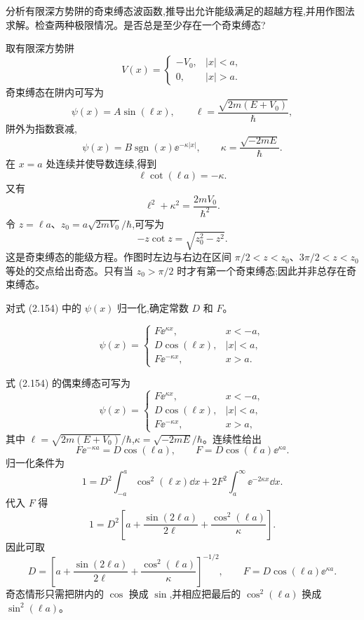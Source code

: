 \begin{question}
分析有限深方势阱的奇束缚态波函数,推导出允许能级满足的超越方程,并用作图法求解。检查两种极限情况。是否总是至少存在一个奇束缚态?
\begin{solution}
取有限深方势阱
\[
V(x)=\begin{cases}-V_0,& |x|<a,\\0,& |x|>a.
\end{cases}
\]
奇束缚态在阱内可写为
\[
\psi(x)=A\sin(\ell x),
\qquad
\ell=\frac{\sqrt{2m(E+V_0)}}{\hbar},
\]
阱外为指数衰减,
\[
\psi(x)=B\operatorname{sgn}(x)\ee^{-\kappa |x|},
\qquad
\kappa=\frac{\sqrt{-2mE}}{\hbar}.
\]
在 $x=a$ 处连续并使导数连续,得到
\[
\ell\cot(\ell a)=-\kappa.
\]
又有
\[
\ell^2+\kappa^2=\frac{2mV_0}{\hbar^2}.
\]
令 $z=\ell a$、$z_0=a\sqrt{2mV_0}/\hbar$,可写为
\[
-z\cot z=\sqrt{z_0^2-z^2}.
\]
这是奇束缚态的能级方程。作图时左边与右边在区间 $\pi/2<z<z_0$、$3\pi/2<z<z_0$ 等处的交点给出奇态。只有当 $z_0>\pi/2$ 时才有第一个奇束缚态;因此并非总存在奇束缚态。
\end{solution}
\end{question}

\begin{question}
对式 (2.154) 中的 $\psi(x)$ 归一化,确定常数 $D$ 和 $F$。

\par\smallskip
{}\[\psi(x)=\begin{cases}F\ee^{\kappa x},&x<-a,\\D\cos(\ell x),&|x|<a,\\F\ee^{-\kappa x},&x>a.\end{cases}\]

\begin{solution}
式 (2.154) 的偶束缚态可写为
\[
\psi(x)=\begin{cases}
F \ee^{\kappa x},&x<-a,\\
D\cos(\ell x),& |x|<a,\\
F \ee^{-\kappa x},&x>a,
\end{cases}
\]
其中 $\ell=\sqrt{2m(E+V_0)}/\hbar$,$\kappa=\sqrt{-2mE}/\hbar$。连续性给出
\[
F \ee^{-\kappa a}=D\cos(\ell a),
\qquad
F=D\cos(\ell a)\ee^{\kappa a}.
\]
归一化条件为
\[
1=D^2\int_{-a}^{a}\cos^2(\ell x)\dd x
+2F^2\int_a^\infty \ee^{-2\kappa x}\dd x.
\]
代入 $F$ 得
\[
1=D^2\left[a+\frac{\sin(2\ell a)}{2\ell}+\frac{\cos^2(\ell a)}{\kappa}\right].
\]
因此可取
\[
D=\left[a+\frac{\sin(2\ell a)}{2\ell}+\frac{\cos^2(\ell a)}{\kappa}\right]^{-1/2},
\qquad
F=D\cos(\ell a)\ee^{\kappa a}.
\]
奇态情形只需把阱内的 $\cos$ 换成 $\sin$,并相应把最后的 $\cos^2(\ell a)$ 换成 $\sin^2(\ell a)$。
\end{solution}
\end{question}

